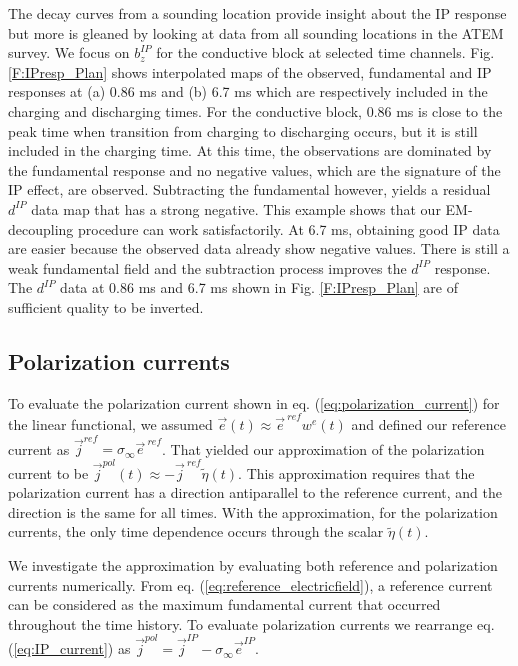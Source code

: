 \documentclass[extra,mreferee]{gji}
\newcommand{\siginf}{\sigma_\infty}
\renewcommand {\j}  { {\vec j} }
\newcommand {\e}  { {\vec e} }
\newcommand{\peta}{\tilde{\eta}}
\newcommand{\eref}{\e^{\ ref}}
\newcommand{\dip}{d^{IP}}
\begin{document}
The decay curves from a sounding location  provide insight about the IP response but more is gleaned by looking at data from all  sounding locations in the ATEM survey. We focus on $b_z^{IP}$ for the conductive block at selected time channels. Fig. \ref{F:IPresp_Plan} shows interpolated maps of the observed, fundamental and IP responses at (a) 0.86 ms and (b) 6.7 ms which are respectively included in the charging and discharging times. For the conductive block, 0.86 ms is close to the peak time when transition from charging to discharging occurs, but it is still included in the charging time. 
At this time, the observations are dominated by the fundamental response and no negative values,  which are the signature of the IP effect, are observed. Subtracting the fundamental however, yields a residual $\dip$ data map that has a strong negative. This  example  shows that our EM-decoupling procedure can  work satisfactorily.  At 6.7 ms, obtaining good IP data are easier because the observed data already show negative values. There is still a weak fundamental field and the subtraction process improves the $\dip$ response. The $\dip$ data at  0.86 ms and 6.7 ms shown in Fig. \ref{F:IPresp_Plan} are of sufficient quality to be inverted. 



\subsection{Polarization currents}
To evaluate the polarization current shown in eq. (\ref{eq:polarization_current}) for the linear functional, we assumed $\e(t) \approx \eref w^e(t)$ and defined our reference current as $\j^{ref}=\siginf \eref$. That yielded our approximation of the polarization current to be $\j^{pol}(t) \approx -\j^{\ ref} \peta(t)$. This approximation requires that the polarization current has a  direction antiparallel to the reference current, and the direction is the same for all times. With the approximation, for the polarization currents, the only time dependence occurs through the scalar $\peta(t)$. 


We investigate the approximation by evaluating both reference and polarization currents numerically.
From eq. (\ref{eq:reference_electricfield}), a reference current can be considered as the maximum fundamental current that occurred throughout the  time history. 
To evaluate polarization currents we rearrange eq. (\ref{eq:IP_current}) as $\j^{pol} = \j^{IP} - \siginf\e^{IP}$. 
\end{document}
